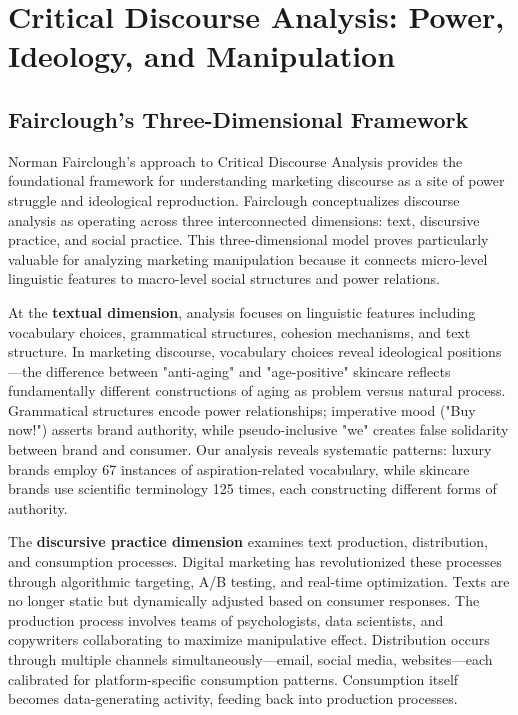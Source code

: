 \section{Critical Discourse Analysis: Power, Ideology, and Manipulation}
\label{sec:cda_theory}

\subsection{Fairclough's Three-Dimensional Framework}

Norman Fairclough's approach to Critical Discourse Analysis provides the foundational framework for understanding marketing discourse as a site of power struggle and ideological reproduction. Fairclough conceptualizes discourse analysis as operating across three interconnected dimensions: text, discursive practice, and social practice. This three-dimensional model proves particularly valuable for analyzing marketing manipulation because it connects micro-level linguistic features to macro-level social structures and power relations.

At the \textbf{textual dimension}, analysis focuses on linguistic features including vocabulary choices, grammatical structures, cohesion mechanisms, and text structure. In marketing discourse, vocabulary choices reveal ideological positions—the difference between "anti-aging" and "age-positive" skincare reflects fundamentally different constructions of aging as problem versus natural process. Grammatical structures encode power relationships; imperative mood ("Buy now!") asserts brand authority, while pseudo-inclusive "we" creates false solidarity between brand and consumer. Our analysis reveals systematic patterns: luxury brands employ 67 instances of aspiration-related vocabulary, while skincare brands use scientific terminology 125 times, each constructing different forms of authority.

The \textbf{discursive practice dimension} examines text production, distribution, and consumption processes. Digital marketing has revolutionized these processes through algorithmic targeting, A/B testing, and real-time optimization. Texts are no longer static but dynamically adjusted based on consumer responses. The production process involves teams of psychologists, data scientists, and copywriters collaborating to maximize manipulative effect. Distribution occurs through multiple channels simultaneously—email, social media, websites—each calibrated for platform-specific consumption patterns. Consumption itself becomes data-generating activity, feeding back into production processes.

